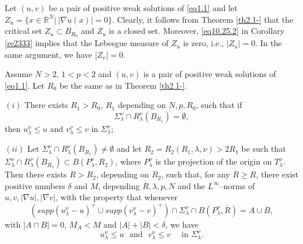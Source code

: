 \documentclass[10pt,a4paper]{amsart}
\newcommand{\R}{\mathbb{R}}
\begin{document}
\begin{rem}\label{re2334}
Let $(u,v)$ be a pair of positive weak solutions of \eqref{eq1.1} and let $Z_u = \{x \in \R^N|\ |\nabla u(x)| = 0 \}$. Clearly, it follows from Theorem \ref{th2.1-} that the critical set $Z_u\subset B_{R_0}$ and $Z_u$ is a closed set. Moreover, \eqref{eq10.25.2} in Corollary \ref{re2333} implies that the Lebesgue measure of $Z_{u}$ is zero, i.e., $|Z_u|=0$. In the same argument, we have $|Z_v|=0$.
\end{rem}

\begin{lem}\label{lm.4.1}
Assume $N>2$, $1<p<2$ and $(u, v)$ is a pair of positive weak solutions of \eqref{eq1.1}. Let $R_0$ be the same as in Theorem \ref{th2.1-}.

{\bf $(i)$} There exists $R_1>R_0$, $R_1$ depending on $N,p,R_0$, such that if
$$\Sigma_\lambda^\nu \cap R_\lambda^\nu(B_{R_1}) = \emptyset,$$
then $u^{\nu}_{\lambda} \leq u$ and $v^{\nu}_{\lambda} \leq v$ in $\Sigma_\lambda^\nu$;


{\bf $(ii)$} Let $\Sigma_\lambda^\nu \cap R_\lambda^\nu(B_{R_1}) \neq \emptyset$ and let $R_2=R_2(R_1,\lambda,\nu)>2R_{1}$ be such that $\Sigma_\lambda^\nu \cap R_\lambda^\nu(B_{R_1}) \subset B(P_\lambda^\nu,R_2)$, where $P_\lambda^\nu$ is the projection of the origin on $T_\lambda^\nu$.
Then there exists $R>R_2$, depending on $R_2$, such that, for any $\overline{R}\geq R$, there exist positive numbers $\delta$ and $M$, depending $\overline{R},\lambda,p,N$ and the $L^\infty$--norms of $u,v,|\nabla u|,|\nabla v|$, with the property that whenever
$$ (supp(u^{\nu}_{\lambda}-u)^+\cup supp(v^{\nu}_{\lambda}-v)^+)\cap\Sigma^{\nu}_{\lambda}\cap B(P_\lambda^\nu,\overline{R})=A \cup B,$$
with $|A\cap B|=0$, $M_A<M$ and $|A|+|B|<\delta$, we have
$$ u^{\nu}_{\lambda} \leq u\,\,\,\,\mbox{and}\,\,\,\, v^{\nu}_{\lambda} \leq v \,\,\quad \mbox{in}\,\,\Sigma_\lambda^\nu.$$
\end{lem}
\end{document}
